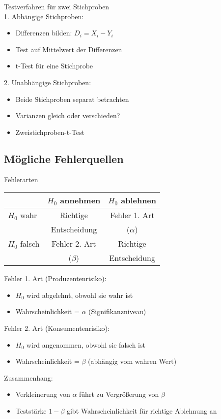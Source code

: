 \begin{concept}{Testverfahren für zwei Stichproben}\\
1. Abhängige Stichproben:
   \begin{itemize}
     \item Differenzen bilden: $D_i = X_i - Y_i$
     \item Test auf Mittelwert der Differenzen
     \item t-Test für eine Stichprobe
   \end{itemize}

2. Unabhängige Stichproben:
   \begin{itemize}
     \item Beide Stichproben separat betrachten
     \item Varianzen gleich oder verschieden?
     \item Zweistichproben-t-Test
   \end{itemize}
\end{concept}

\subsection{Mögliche Fehlerquellen}

\begin{concept}{Fehlerarten}\\
\begin{center}
\begin{tabular}{|l|c|c|}
\hline
& $H_0$ annehmen & $H_0$ ablehnen \\
\hline
$H_0$ wahr & Richtige & Fehler 1. Art \\
& Entscheidung & ($\alpha$) \\
\hline
$H_0$ falsch & Fehler 2. Art & Richtige \\
& ($\beta$) & Entscheidung \\
\hline
\end{tabular}
\end{center}

Fehler 1. Art (Produzentenrisiko):
\begin{itemize}
  \item $H_0$ wird abgelehnt, obwohl sie wahr ist
  \item Wahrscheinlichkeit = $\alpha$ (Signifikanzniveau)
\end{itemize}

Fehler 2. Art (Konsumentenrisiko):
\begin{itemize}
  \item $H_0$ wird angenommen, obwohl sie falsch ist
  \item Wahrscheinlichkeit = $\beta$ (abhängig vom wahren Wert)
\end{itemize}

Zusammenhang:
\begin{itemize}
  \item Verkleinerung von $\alpha$ führt zu Vergrößerung von $\beta$
  \item Teststärke $1-\beta$ gibt Wahrscheinlichkeit für richtige Ablehnung an
\end{itemize}
\end{concept}


